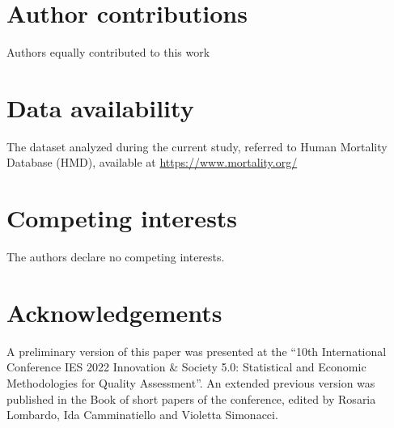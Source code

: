 \documentclass[fleqn,10pt]{wlscirep}
\begin{document}
\section*{Author contributions}
Authors equally contributed to this work

\section*{Data availability}
The dataset analyzed during the current study, referred to Human Mortality Database (HMD), available at \url{https://www.mortality.org/}

\section*{Competing interests}
The authors declare no competing interests.

\section*{Acknowledgements}
A preliminary version of this paper was presented at the “10th International Conference IES 2022 Innovation \& Society 5.0: Statistical and Economic Methodologies for Quality Assessment”. An extended previous version was published in the Book of short papers of the conference, edited by Rosaria Lombardo, Ida Camminatiello and Violetta Simonacci.
\end{document}
